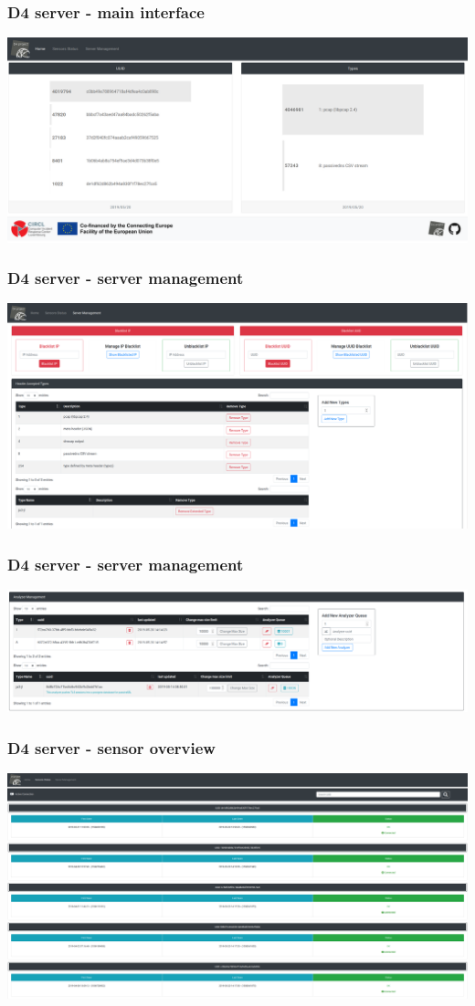 \documentclass{beamer}
\begin{document}
\begin{frame}
        \frametitle{D4 server - main interface}
        \includegraphics[width=\textwidth]{./d4-5.png}
\end{frame}

\begin{frame}
        \frametitle{D4 server - server management}
        \includegraphics[width=\textwidth]{./d4-2.png}
\end{frame}

\begin{frame}
        \frametitle{D4 server - server management}
        \includegraphics[width=\textwidth]{./d4-3.png}
\end{frame}

\begin{frame}
        \frametitle{D4 server - sensor overview}
        \includegraphics[width=\textwidth]{./d4-1.png}
\end{frame}
\end{document}
